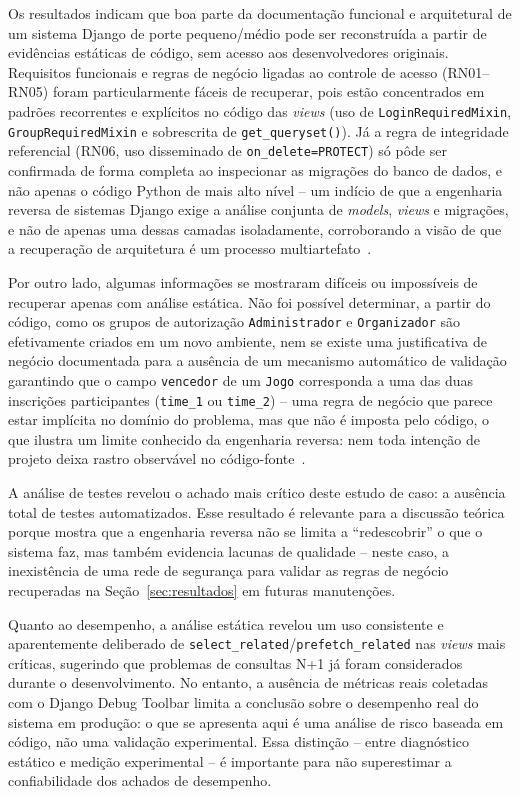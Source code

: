 \documentclass[12pt]{article}
\begin{document}
Os resultados indicam que boa parte da documentação funcional e
arquitetural de um sistema Django de porte pequeno/médio pode ser
reconstruída a partir de evidências estáticas de código, sem acesso aos
desenvolvedores originais. Requisitos funcionais e regras de negócio
ligadas ao controle de acesso (RN01--RN05) foram particularmente fáceis de
recuperar, pois estão concentrados em padrões recorrentes e explícitos no
código das \emph{views} (uso de \texttt{LoginRequiredMixin},
\texttt{GroupRequiredMixin} e sobrescrita de \texttt{get\_queryset()}). Já a
regra de integridade referencial (RN06, uso disseminado de
\texttt{on\_delete=PROTECT}) só pôde ser confirmada de forma completa ao
inspecionar as migrações do banco de dados, e não apenas o código Python de
mais alto nível -- um indício de que a engenharia reversa de sistemas Django
exige a análise conjunta de \emph{models}, \emph{views} e migrações, e não
de apenas uma dessas camadas isoladamente, corroborando a visão de que a
recuperação de arquitetura é um processo multiartefato~\cite{koschke2009}.

Por outro lado, algumas informações se mostraram difíceis ou impossíveis de
recuperar apenas com análise estática. Não foi possível determinar, a partir
do código, como os grupos de autorização \texttt{Administrador} e
\texttt{Organizador} são efetivamente criados em um novo ambiente, nem se
existe uma justificativa de negócio documentada para a ausência de um
mecanismo automático de validação garantindo que o campo \texttt{vencedor}
de um \texttt{Jogo} corresponda a uma das duas inscrições participantes
(\texttt{time\_1} ou \texttt{time\_2}) -- uma regra de negócio que parece
estar implícita no domínio do problema, mas que não é imposta pelo código,
o que ilustra um limite conhecido da engenharia reversa: nem toda intenção
de projeto deixa rastro observável no código-fonte~\cite{chikofsky1990}.

A análise de testes revelou o achado mais crítico deste estudo de caso: a
ausência total de testes automatizados. Esse resultado é relevante para a
discussão teórica porque mostra que a engenharia reversa não se limita a
``redescobrir'' o que o sistema faz, mas também evidencia lacunas de
qualidade -- neste caso, a inexistência de uma rede de segurança para
validar as regras de negócio recuperadas na Seção~\ref{sec:resultados} em
futuras manutenções.

Quanto ao desempenho, a análise estática revelou um uso consistente e
aparentemente deliberado de \texttt{select\_related}/\texttt{prefetch\_related}
nas \emph{views} mais críticas, sugerindo que problemas de consultas N+1 já
foram considerados durante o desenvolvimento. No entanto, a ausência de
métricas reais coletadas com o Django Debug Toolbar limita a conclusão sobre
o desempenho real do sistema em produção: o que se apresenta aqui é uma
análise de risco baseada em código, não uma validação experimental. Essa
distinção -- entre diagnóstico estático e medição experimental -- é
importante para não superestimar a confiabilidade dos achados de desempenho.
\end{document}
